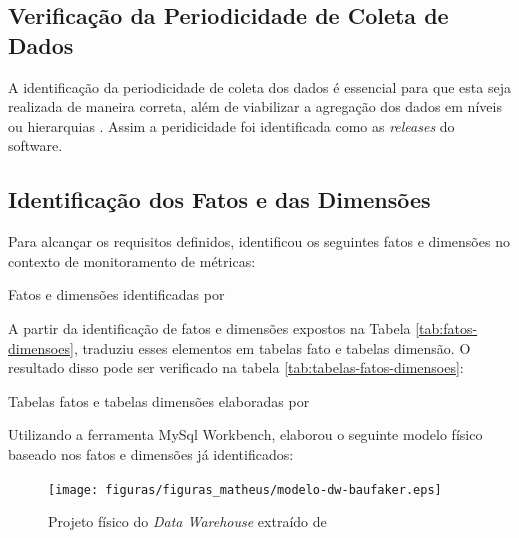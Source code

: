\subsection{Verificação da Periodicidade de Coleta de Dados}

A identificação da periodicidade de coleta dos dados é essencial para que esta seja
realizada de maneira correta, além de viabilizar a agregação dos dados em níveis ou
hierarquias \cite{rego_monitoramento_2014}. Assim a peridicidade foi identificada como as \textit{releases} do software.

\subsection{Identificação dos Fatos e das Dimensões}
	
Para alcançar os requisitos definidos,  identificou os seguintes fatos e dimensões no contexto de monitoramento de métricas:

\begin{table}[!ht]
	\begin{center}
	
	 
	\caption{Fatos e dimensões identificadas por }
	\label{tab:fatos-dimensoes}
	\end{center}
	\end{table}	
	\FloatBarrier


A partir da identificação de fatos e dimensões expostos na Tabela \ref{tab:fatos-dimensoes},   traduziu esses elementos em tabelas fato e tabelas dimensão. O resultado disso pode ser verificado na tabela \ref{tab:tabelas-fatos-dimensoes}:

\begin{table}[!ht]
	\begin{center}
	
	 
	\caption{Tabelas fatos e tabelas dimensões elaboradas por }
	\label{tab:tabelas-fatos-dimensoes}
	\end{center}
	\end{table}	
	\FloatBarrier


Utilizando a ferramenta MySql Workbench,  elaborou o seguinte modelo físico baseado nos fatos e dimensões já identificados:

\begin{figure}[h!]
\centering
\texttt{[image: figuras/figuras\_matheus/modelo-dw-baufaker.eps]}
\caption{Projeto físico do \textit{Data Warehouse} extraído de }
\label{fig:arquitetura_solucao}
\end{figure}
\FloatBarrier

